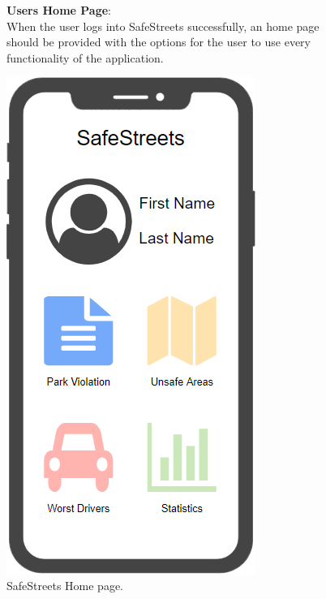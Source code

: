 \begin{figure}
	\begin{flushleft}
		\textbf{Users Home Page}:\\
		When the user logs into SafeStreets successfully, an home page should be provided with the options for the user to use every functionality of the application.
	\end{flushleft}
	\centering
	\includegraphics[width=0.6\linewidth]{../RASD/images/mockups/homePage}
	\caption{SafeStreets Home page.}
	\label{fig:home}
\end{figure}
\clearpage
